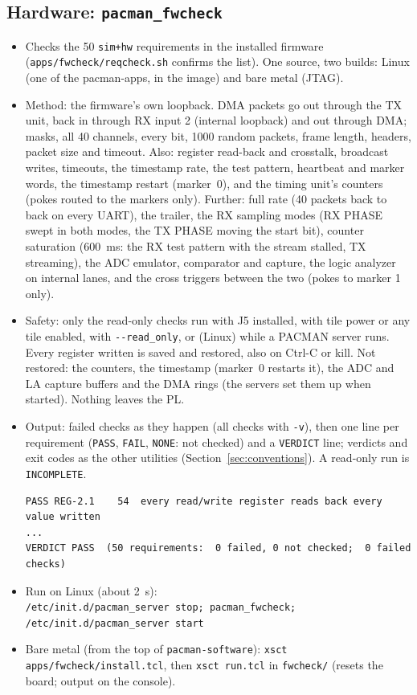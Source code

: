 \documentclass[11pt]{article}
\newcommand{\opt}[1]{\texttt{-{}-#1}}
\begin{document}
\subsection{Hardware: \texttt{pacman\_fwcheck}}

\begin{itemize}
\item Checks the 50 \texttt{sim+hw} requirements in the installed firmware (\texttt{apps/fwcheck/reqcheck.sh}
  confirms the list).  One source, two builds: Linux (one of the pacman-apps, in the image) and bare metal (JTAG).
\item Method: the firmware's own loopback.  DMA packets go out through the TX unit, back in through RX input 2
  (internal loopback) and out through DMA; masks, all 40 channels, every bit, 1000 random packets, frame length,
  headers, packet size and timeout.  Also: register read-back and crosstalk, broadcast writes, timeouts, the
  timestamp rate, the test pattern, heartbeat and marker words, the timestamp restart (marker~0), and the timing unit's counters (pokes routed
  to the markers only).  Further:  full rate (40 packets back to back on every UART), the trailer, the RX sampling modes (RX PHASE
  swept in both modes, the TX PHASE moving the start bit), counter saturation (600~ms:  the RX test pattern with the
  stream stalled, TX streaming), the ADC emulator, comparator and capture, the logic analyzer on internal lanes, and
  the cross triggers between the two (pokes to marker 1 only).
\item Safety: only the read-only checks run with J5 installed, with tile power or any tile enabled, with
  \opt{read\_only}, or (Linux) while a PACMAN server runs.  Every register written is saved and restored, also on
  Ctrl-C or kill.  Not restored: the counters, the timestamp (marker~0 restarts it), the ADC and LA capture buffers and the DMA rings (the servers set
  them up when started).  Nothing leaves the PL.
\item Output: failed checks as they happen (all checks with \texttt{-v}), then one line per requirement
  (\texttt{PASS}, \texttt{FAIL}, \texttt{NONE}: not checked) and a \texttt{VERDICT} line; verdicts and exit codes
  as the other utilities (Section~\ref{sec:conventions}).  A read-only run is \texttt{INCOMPLETE}.
\begin{verbatim}
PASS REG-2.1    54  every read/write register reads back every value written
...
VERDICT PASS  (50 requirements:  0 failed, 0 not checked;  0 failed checks)
\end{verbatim}
\item Run on Linux (about 2~s):\\
  \texttt{/etc/init.d/pacman\_server stop; pacman\_fwcheck; /etc/init.d/pacman\_server start}
\item Bare metal (from the top of \texttt{pacman-software}): \texttt{xsct apps/fwcheck/install.tcl}, then
  \texttt{xsct run.tcl} in \texttt{fwcheck/} (resets the board; output on the console).
\end{itemize}
\end{document}
